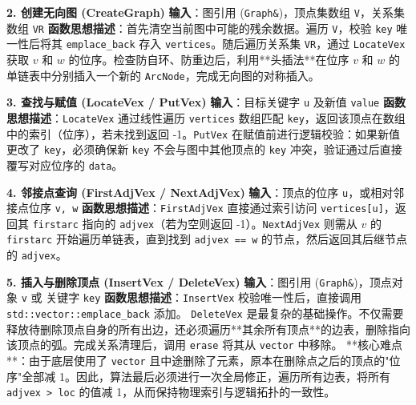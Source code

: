 \documentclass[supercite]{Experimental_Report}
\theoremstyle{definition}
\begin{document}
\vspace{0.5em}
\noindent\textbf{2. 创建无向图 (CreateGraph)}
\newline\textbf{输入}：图引用 (\texttt{Graph\&})，顶点集数组 \texttt{V}，关系集数组 \texttt{VR}
\newline\textbf{函数思想描述}：首先清空当前图中可能的残余数据。遍历 \texttt{V}，校验 \texttt{key} 唯一性后将其 \texttt{emplace\_back} 存入 \texttt{vertices}。随后遍历关系集 \texttt{VR}，通过 \texttt{LocateVex} 获取 $v$ 和 $w$ 的位序。检查防自环、防重边后，利用**头插法**在位序 $v$ 和 $w$ 的单链表中分别插入一个新的 \texttt{ArcNode}，完成无向图的对称插入。

\vspace{0.5em}
\noindent\textbf{3. 查找与赋值 (LocateVex / PutVex)}
\newline\textbf{输入}：目标关键字 \texttt{u} 及新值 \texttt{value}
\newline\textbf{函数思想描述}：\texttt{LocateVex} 通过线性遍历 \texttt{vertices} 数组匹配 \texttt{key}，返回该顶点在数组中的索引（位序），若未找到返回 -1。\texttt{PutVex} 在赋值前进行逻辑校验：如果新值更改了 \texttt{key}，必须确保新 \texttt{key} 不会与图中其他顶点的 \texttt{key} 冲突，验证通过后直接覆写对应位序的 \texttt{data}。

\vspace{0.5em}
\noindent\textbf{4. 邻接点查询 (FirstAdjVex / NextAdjVex)}
\newline\textbf{输入}：顶点的位序 \texttt{u}，或相对邻接点位序 \texttt{v, w}
\newline\textbf{函数思想描述}：\texttt{FirstAdjVex} 直接通过索引访问 \texttt{vertices[u]}，返回其 \texttt{firstarc} 指向的 \texttt{adjvex}（若为空则返回 -1）。\texttt{NextAdjVex} 则需从 $v$ 的 \texttt{firstarc} 开始遍历单链表，直到找到 \texttt{adjvex == w} 的节点，然后返回其后继节点的 \texttt{adjvex}。

\vspace{0.5em}
\noindent\textbf{5. 插入与删除顶点 (InsertVex / DeleteVex)}
\newline\textbf{输入}：图引用 (\texttt{Graph\&})，顶点对象 \texttt{v} 或 关键字 \texttt{key}
\newline\textbf{函数思想描述}：\texttt{InsertVex} 校验唯一性后，直接调用 \texttt{std::vector::emplace\_back} 添加。
\texttt{DeleteVex} 是最复杂的基础操作。不仅需要释放待删除顶点自身的所有出边，还必须遍历**其余所有顶点**的边表，删除指向该顶点的弧。完成关系清理后，调用 \texttt{erase} 将其从 \texttt{vector} 中移除。
**核心难点**：由于底层使用了 \texttt{vector} 且中途删除了元素，原本在删除点之后的顶点的"位序"全部减 1。因此，算法最后必须进行一次全局修正，遍历所有边表，将所有 \texttt{adjvex > loc} 的值减 1，从而保持物理索引与逻辑拓扑的一致性。
\end{document}
